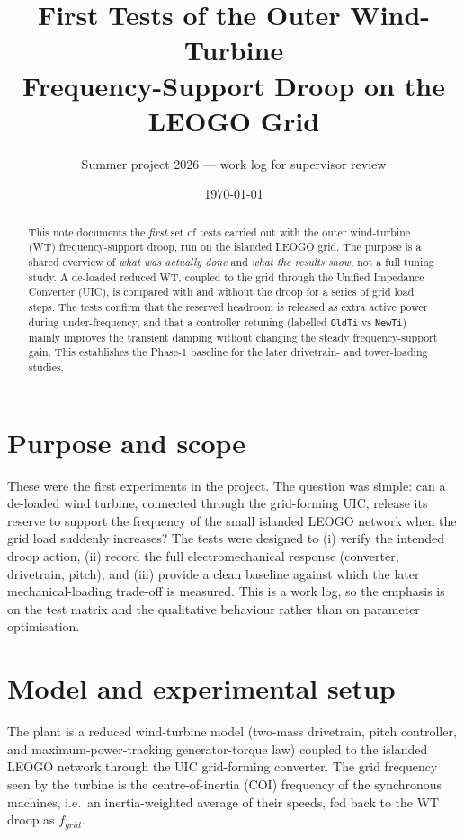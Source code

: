 \documentclass[11pt]{article}
\title{First Tests of the Outer Wind-Turbine\\ Frequency-Support Droop on the LEOGO Grid}
\author{Summer project 2026 --- work log for supervisor review}
\date{\today}
\begin{document}
\maketitle

\begin{abstract}
\noindent This note documents the \emph{first} set of tests carried out with the
outer wind-turbine (WT) frequency-support droop, run on the islanded LEOGO
grid. The purpose is a shared overview of \emph{what was actually done} and
\emph{what the results show}, not a full tuning study. A de-loaded reduced WT,
coupled to the grid through the Unified Impedance Converter (UIC), is compared
with and without the droop for a series of grid load steps. The tests confirm
that the reserved headroom is released as extra active power during
under-frequency, and that a controller retuning (labelled \texttt{OldTi} vs
\texttt{NewTi}) mainly improves the transient damping without changing the
steady frequency-support gain. This establishes the Phase-1 baseline for the
later drivetrain- and tower-loading studies.
\end{abstract}

\section{Purpose and scope}
\label{sec:dft-purpose}
These were the first experiments in the project. The question was simple: can a
de-loaded wind turbine, connected through the grid-forming UIC, release its
reserve to support the frequency of the small islanded LEOGO network when the
grid load suddenly increases? The tests were designed to (i) verify the intended
droop action, (ii) record the full electromechanical response (converter,
drivetrain, pitch), and (iii) provide a clean baseline against which the later
mechanical-loading trade-off is measured. This is a work log, so the emphasis is
on the test matrix and the qualitative behaviour rather than on parameter
optimisation.

\section{Model and experimental setup}
\label{sec:dft-setup}
The plant is a reduced wind-turbine model (two-mass drivetrain, pitch
controller, and maximum-power-tracking generator-torque law) coupled to the
islanded LEOGO network through the UIC grid-forming converter. The grid
frequency seen by the turbine is the centre-of-inertia (COI) frequency of the
synchronous machines, i.e.\ an inertia-weighted average of their speeds, fed
back to the WT droop as \(f_{grid}\).
\end{document}
